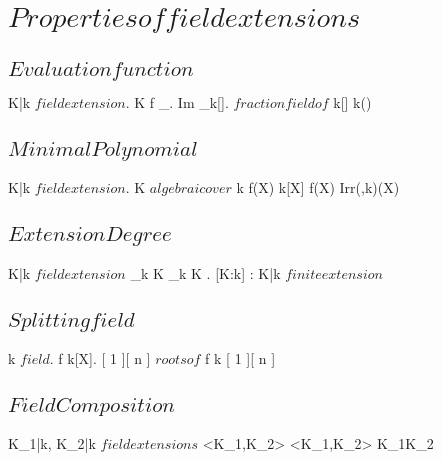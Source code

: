 \documentclass[a5paper]{book}
\begin{document}
\section{ $ Properties of field extensions $ }
{
	\subsection{ $ Evaluation function $ }

	{
		K|k $ field extension $.
		\theta \in K
	}
	{
	}
	\denote
	{
		f \as \Psi_\theta.
		Im \; \psi_\theta \as k[\theta].
		$ fraction field of $ k[\theta] \as k(\theta)
	}


	\subsection{ $ Minimal Polynomial $ }

	{
		K|k $ field extension $.
		\theta \in K $ algebraic over $ k
	}
	{
		f(X) \in k[X] \suchthat \logicand {}
	}
	\denote
	{
		f(X) \as Irr(\theta,k)(X)
	}

	\subsection{ $ Extension Degree $ }

	{
		K|k $ field extension $
	}
	{
		\dim_k K \in \N \cup \set{ \infty }
	}
	\denote
	{
		\dim_k K \as [ K : k ].
		[K:k] \in \N : K|k $ finite extension $
	}


	\newpage


	\subsection{ $ Splitting field $ }

	{
		k $ field $.
		f \in k[X].
		[ 1 ][ n ] $ roots of $ f
	}
	{
		k [ 1 ][ n ]
	}


	\subsection{ $ Field Composition $ }

	{
		K_1|k, K_2|k $ field extensions $ 
	}
	{
		<K_1,K_2>
	}
	\denote
	{
		<K_1,K_2> \as K_1K_2
	}
	
}
\end{document}
